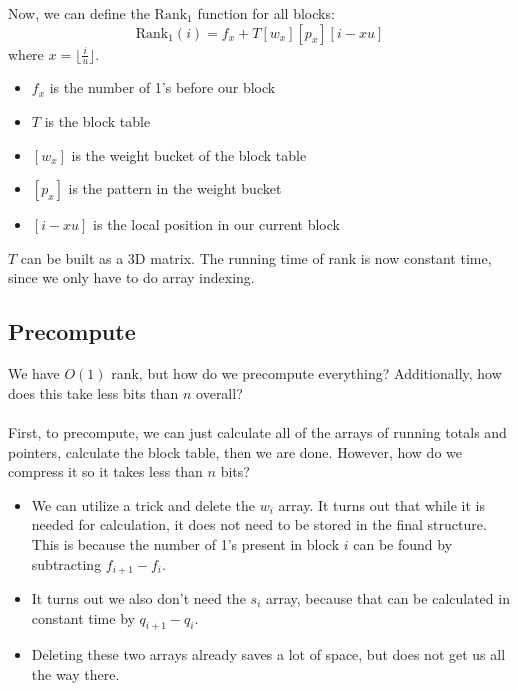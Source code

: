 \documentclass[10pt]{article}
\newcommand{\rank}{\text{Rank}}
\begin{document}
Now, we can define the $\rank_1$ function for all blocks:
\[\rank_1(i) = f_x + T[w_x][p_x][i - xu]\]
where $x = \lfloor \frac{i}{u} \rfloor$.
\begin{itemize}
    \item $f_x$ is the number of 1's before our block 
    \item $T$ is the block table
    \item $[w_x]$ is the weight bucket of the block table
    \item $[p_x]$ is the pattern in the weight bucket
    \item $[i - xu]$ is the local position in our current block
\end{itemize}
$T$ can be built as a 3D matrix.  The running time of rank is now constant time, since we only have to do array indexing.

\subsection*{Precompute}
We have $O(1)$ rank, but how do we precompute everything?  Additionally, how does this take less bits than $n$ overall?\\\\
First, to precompute, we can just calculate all of the arrays of running totals and pointers, calculate the block table, then we are done.  However, how do we compress it so it takes less than $n$ bits?
\begin{itemize}
    \item We can utilize a trick and delete the $w_i$ array.  It turns out that while it is needed for calculation, it does not need to be stored in the final structure.  This is because the number of 1's present in block $i$ can be found by subtracting $f_{i + 1} - f_i$.
    \item It turns out we also don't need the $s_i$ array, because that can be calculated in constant time by $q_{i + 1} - q_i$.
    \item Deleting these two arrays already saves a lot of space, but does not get us all the way there.
\end{itemize}
\end{document}
